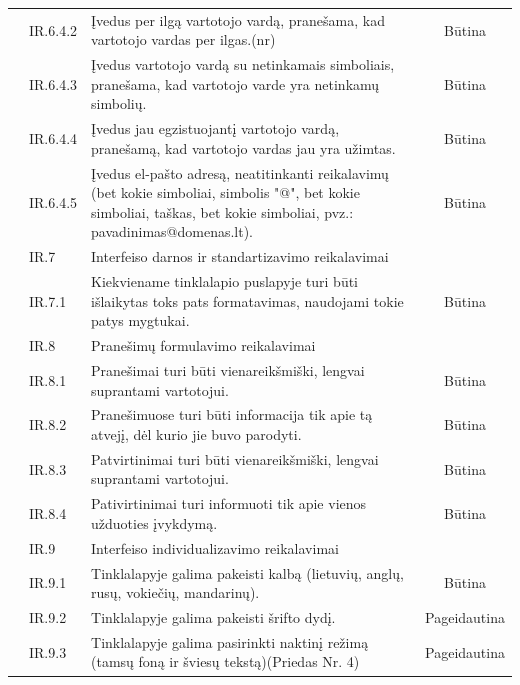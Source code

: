 \documentclass{VUMIFPSkursinis}
\begin{document}
\begin{longtable}{|p{1cm}|p{3cm}|p{9cm}|c|}
 & IR.6.4.2 & Įvedus per ilgą vartotojo vardą, pranešama, kad vartotojo vardas per ilgas.(nr) & Būtina \\ \cline{2-4} 
 & IR.6.4.3 & Įvedus vartotojo vardą su netinkamais simboliais, pranešama, kad vartotojo varde yra netinkamų simbolių. & Būtina \\ \cline{2-4} 
 & IR.6.4.4 & Įvedus jau egzistuojantį vartotojo vardą, pranešamą, kad vartotojo vardas jau yra užimtas. & Būtina \\ \cline{2-4} 
 & IR.6.4.5 & Įvedus el-pašto adresą, neatitinkanti reikalavimų (bet kokie simboliai, simbolis "@", bet kokie simboliai, taškas, bet kokie simboliai, pvz.: pavadinimas@domenas.lt). & Būtina \\ \cline{2-4} 
 &  \cellcolor{light-gray}IR.7 & \multicolumn{2}{l|}{ \cellcolor{light-gray}Interfeiso darnos ir standartizavimo reikalavimai} \\ \cline{2-4} 
 & IR.7.1 & Kiekviename tinklalapio puslapyje turi būti išlaikytas toks pats formatavimas, naudojami tokie patys mygtukai. & Būtina \\ \cline{2-4} 
 &  \cellcolor{light-gray}IR.8 & \multicolumn{2}{l|}{ \cellcolor{light-gray}Pranešimų formulavimo reikalavimai} \\ \cline{2-4} 
 & IR.8.1 & Pranešimai turi būti vienareikšmiški, lengvai suprantami vartotojui. & Būtina \\ \cline{2-4} 
 & IR.8.2 & Pranešimuose turi būti informacija tik apie tą atvejį, dėl kurio jie buvo parodyti. & Būtina \\ \cline{2-4} 
 & IR.8.3 & Patvirtinimai turi būti vienareikšmiški, lengvai suprantami vartotojui. & Būtina \\ \cline{2-4} 
 & IR.8.4 & Pativirtinimai turi informuoti tik apie vienos užduoties įvykdymą. & Būtina \\ \cline{2-4} 
 &  \cellcolor{light-gray}IR.9 & \multicolumn{2}{l|}{ \cellcolor{light-gray}Interfeiso individualizavimo reikalavimai} \\ \cline{2-4} 
 & IR.9.1 & Tinklalapyje galima pakeisti kalbą (lietuvių, anglų, rusų, vokiečių, mandarinų). & Būtina \\ \cline{2-4} 
 & IR.9.2 & Tinklalapyje galima pakeisti šrifto dydį. & Pageidautina \\ \cline{2-4} 
 & IR.9.3 & Tinklalapyje galima pasirinkti naktinį režimą (tamsų foną ir šviesų tekstą)(Priedas Nr. 4) & Pageidautina \\ \hline
 \end{longtable}
\end{document}

